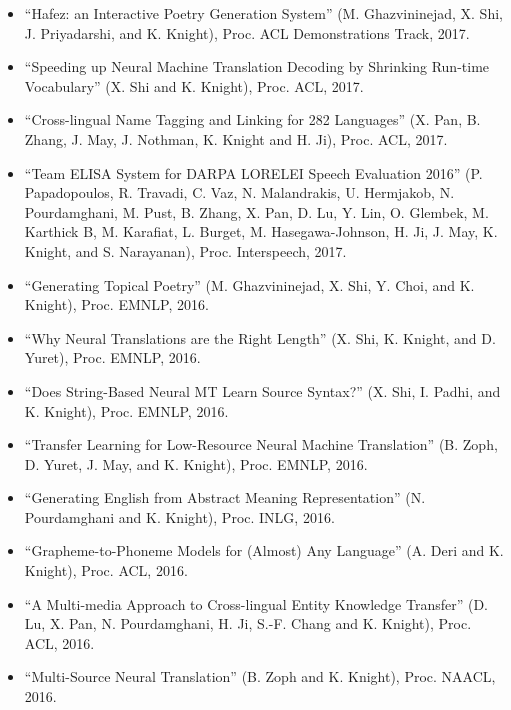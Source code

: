 \begin{itemize}
\item ``Hafez: an Interactive Poetry Generation System'' (M. Ghazvininejad, 
 X. Shi, J. Priyadarshi, and K. Knight), 
 Proc. ACL Demonstrations Track, 2017. 

\item ``Speeding up Neural Machine Translation Decoding by Shrinking Run-time Vocabulary'' (X. Shi and K. Knight), Proc. ACL, 2017. 

\item ``Cross-lingual Name Tagging and Linking for 282 Languages'' (X. Pan, B. Zhang, J. May, J. Nothman, K. Knight and H. Ji), Proc. ACL, 2017. 

\item ``Team ELISA System for DARPA LORELEI Speech Evaluation 2016'' (P. Papadopoulos, R. Travadi, C. Vaz, N. Malandrakis, U. Hermjakob, N. Pourdamghani, M. Pust, B. Zhang, X. Pan, D. Lu, Y. Lin, O. Glembek, M. Karthick B, M. Karafiat, L. Burget, M. Hasegawa-Johnson, H. Ji, J. May, K. Knight, and S. Narayanan), Proc. Interspeech, 2017. 

\item ``Generating Topical Poetry'' (M. Ghazvininejad, X. Shi, Y. Choi, and K. Knight), Proc. EMNLP, 2016. 

\item ``Why Neural Translations are the Right Length'' (X. Shi, K. Knight, and D. Yuret), Proc. EMNLP, 2016. 

\item ``Does String-Based Neural MT Learn Source Syntax?'' (X. Shi, I. Padhi, and K. Knight), Proc. EMNLP, 2016. 

\item ``Transfer Learning for Low-Resource Neural Machine Translation'' (B. Zoph, D. Yuret, J. May, and K. Knight), Proc. EMNLP, 2016. 



\item ``Generating English from Abstract Meaning Representation'' (N. Pourdamghani and K. Knight), Proc. INLG, 2016. 

\item ``Grapheme-to-Phoneme Models for (Almost) Any Language'' (A. Deri and K. Knight), Proc. ACL, 2016. 

\item ``A Multi-media Approach to Cross-lingual Entity Knowledge Transfer'' (D. Lu, X. Pan, N. Pourdamghani, H. Ji, S.-F. Chang and K. Knight), Proc. ACL, 2016. 


\item ``Multi-Source Neural Translation'' (B. Zoph and K. Knight), Proc. NAACL, 2016. 


\end{itemize}
